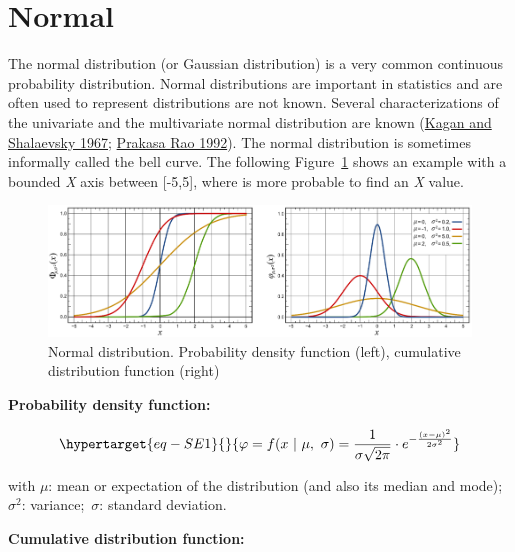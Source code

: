 \documentclass[
  letterpaper,
  DIV=11,
  numbers=noendperiod]{scrreprt}
\begin{document}
\hypertarget{normal}{%
\section{Normal}\label{normal}}

The normal distribution (or Gaussian distribution) is a very common
continuous probability distribution. Normal distributions are important
in statistics and are often used to represent distributions are not
known. Several characterizations of the univariate and the multivariate
normal distribution are known
(\protect\hyperlink{ref-kagan_characterization_1967}{Kagan and
Shalaevsky 1967};
\protect\hyperlink{ref-prakasa_rao_identifiability_1992}{Prakasa Rao
1992}). The normal distribution is sometimes informally called the bell
curve. The following Figure~\ref{fig-distribution_normal} shows an
example with a bounded \emph{X} axis between {[}-5,5{]}, where is more
probable to find an \emph{X} value.

\begin{figure}

{\centering \includegraphics{./figures/fig-distribution_normal.png}

}

\caption{\label{fig-distribution_normal}Normal distribution. Probability
density function (left), cumulative distribution function (right)}

\end{figure}

\textbf{Probability density function:}

\begin{equation}\protect\hypertarget{eq-SE1}{}{
\varphi = f(x\ |\ \mu,\ \sigma) = \frac{1}{\sigma\sqrt{2\pi}} \cdot e^{- \frac{(x - \mu)^{2}}{2\sigma^{2}}}
}\label{eq-SE1}\end{equation}

with \(\mu\): mean or expectation of the distribution (and also its
median and mode); \(\sigma^{2}\): variance;~\(\sigma\): standard
deviation.

\textbf{Cumulative distribution function:}
\end{document}
